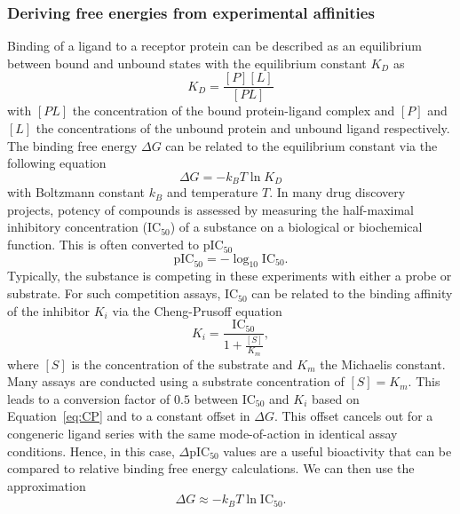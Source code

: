 \documentclass[9pt,bestpractices]{livecoms}
\begin{document}
\subsubsection{Deriving free energies from experimental affinities}
Binding of a ligand to a receptor protein can be described as an equilibrium between bound and unbound states with the equilibrium constant $K_D$ as
\begin{equation*}
    K_D = \frac{[P][L]}{[PL]}
\end{equation*}
with $[PL]$ the concentration of the bound protein-ligand complex and $[P]$ and $[L]$ the concentrations of the unbound protein and unbound ligand respectively. The binding free energy $\Delta G$ can be related to the equilibrium constant via the following equation
\begin{equation}
    \Delta G = -k_B T \ln K_D
\end{equation}
with Boltzmann constant $k_B$ and temperature $T$. 
In many drug discovery projects, potency of compounds is assessed by measuring the half-maximal inhibitory concentration (IC$_{50}$) of a substance on a biological or biochemical function. This is often converted to pIC$_{50}$
\begin{equation*}
    \mathrm{pIC}_{50} = - \log_{10} \mathrm{IC}_{50}.
\end{equation*}
Typically, the substance is competing in these experiments with either a probe or substrate. For such competition assays, IC$_{50}$ can be related to the binding affinity of the inhibitor $K_i$ via the Cheng-Prusoff equation
\begin{equation}\label{eq:CP}
    K_i = \frac{\mathrm{IC}_{50}}{1+\tfrac{[S]}{K_m}},
\end{equation}
where $[S]$ is the concentration of the substrate and $K_m$ the Michaelis constant. Many assays are conducted using a substrate concentration of $[S] = K_m$. This leads to a conversion factor of $0.5$ between IC$_{50}$ and $K_i$ based on Equation~\ref{eq:CP} and to a constant offset in $\Delta G$. This offset cancels out for a congeneric ligand series with the same mode-of-action in identical assay conditions. Hence, in this case, $\Delta $pIC$_{50}$ values are a useful bioactivity that can be compared to relative binding free energy calculations. We can then use the approximation
\begin{equation*}
    \Delta G \approx - k_B T \ln \mathrm{IC}_{50}.
\end{equation*}

\end{document}
